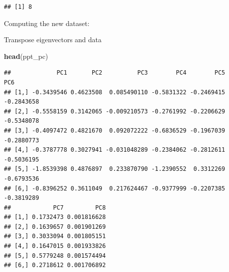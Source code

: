 \documentclass[]{article}
\newenvironment{Shaded}{\begin{snugshade}}{\end{snugshade}}
\newcommand{\CommentTok}[1]{\textcolor[rgb]{0.56,0.35,0.01}{\textit{#1}}}
\newcommand{\KeywordTok}[1]{\textcolor[rgb]{0.13,0.29,0.53}{\textbf{#1}}}
\newcommand{\NormalTok}[1]{#1}
\newcommand{\OperatorTok}[1]{\textcolor[rgb]{0.81,0.36,0.00}{\textbf{#1}}}
\newcommand{\StringTok}[1]{\textcolor[rgb]{0.31,0.60,0.02}{#1}}
\begin{document}
\begin{verbatim}
## [1] 8
\end{verbatim}

Computing the new dataset:

Transpose eigenvectors and data

\begin{Shaded}
\end{Shaded}

\begin{Shaded}
\begin{Highlighting}[]
\KeywordTok{head}\NormalTok{(ppt_pc)}
\end{Highlighting}
\end{Shaded}

\begin{verbatim}
##             PC1       PC2          PC3        PC4        PC5        PC6
## [1,] -0.3439546 0.4623508  0.085490110 -0.5831322 -0.2469415 -0.2843658
## [2,] -0.5558159 0.3142065 -0.009210573 -0.2761992 -0.2206629 -0.5348078
## [3,] -0.4097472 0.4821670  0.092072222 -0.6836529 -0.1967039 -0.2880773
## [4,] -0.3787778 0.3027941 -0.031048289 -0.2384062 -0.2812611 -0.5036195
## [5,] -1.8539398 0.4876897  0.233870790 -1.2390552  0.3312269 -0.6793536
## [6,] -0.8396252 0.3611049  0.217624467 -0.9377999 -0.2207385 -0.3819289
##            PC7         PC8
## [1,] 0.1732473 0.001816628
## [2,] 0.1639657 0.001901269
## [3,] 0.3033094 0.001805151
## [4,] 0.1647015 0.001933826
## [5,] 0.5779248 0.001574494
## [6,] 0.2718612 0.001706892
\end{verbatim}
\end{document}
